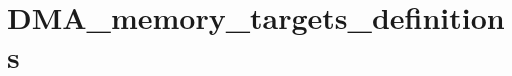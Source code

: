 \hypertarget{group___d_m_a__memory__targets__definitions}{\section{D\-M\-A\-\_\-memory\-\_\-targets\-\_\-definitions}
\label{group___d_m_a__memory__targets__definitions}
}
